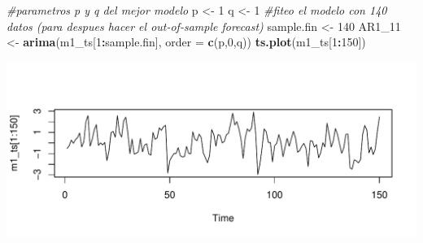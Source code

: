 \documentclass[
  11pt,
]{article}
\newenvironment{Shaded}{\begin{snugshade}}{\end{snugshade}}
\newcommand{\CommentTok}[1]{\textcolor[rgb]{0.56,0.35,0.01}{\textit{#1}}}
\newcommand{\DataTypeTok}[1]{\textcolor[rgb]{0.13,0.29,0.53}{#1}}
\newcommand{\DecValTok}[1]{\textcolor[rgb]{0.00,0.00,0.81}{#1}}
\newcommand{\KeywordTok}[1]{\textcolor[rgb]{0.13,0.29,0.53}{\textbf{#1}}}
\newcommand{\NormalTok}[1]{#1}
\newcommand{\OperatorTok}[1]{\textcolor[rgb]{0.81,0.36,0.00}{\textbf{#1}}}
\newcommand{\StringTok}[1]{\textcolor[rgb]{0.31,0.60,0.02}{#1}}
\begin{document}
\begin{Shaded}
\begin{Highlighting}[]
\CommentTok{#parametros p y q del mejor modelo}
\NormalTok{p <-}\StringTok{ }\DecValTok{1}
\NormalTok{q <-}\StringTok{ }\DecValTok{1}
\CommentTok{#fiteo el modelo con 140 datos (para despues hacer el out-of-sample forecast)}
\NormalTok{sample.fin <-}\StringTok{ }\DecValTok{140}
\NormalTok{AR1_}\DecValTok{11}\NormalTok{ <-}\StringTok{ }\KeywordTok{arima}\NormalTok{(m1_ts[}\DecValTok{1}\OperatorTok{:}\NormalTok{sample.fin], }\DataTypeTok{order =} \KeywordTok{c}\NormalTok{(p,}\DecValTok{0}\NormalTok{,q))}
\KeywordTok{ts.plot}\NormalTok{(m1_ts[}\DecValTok{1}\OperatorTok{:}\DecValTok{150}\NormalTok{])}
\end{Highlighting}
\end{Shaded}

\begin{center}\includegraphics[width=0.9\linewidth]{RmdFigs/fit_2_m1-1} \end{center}
\end{document}
